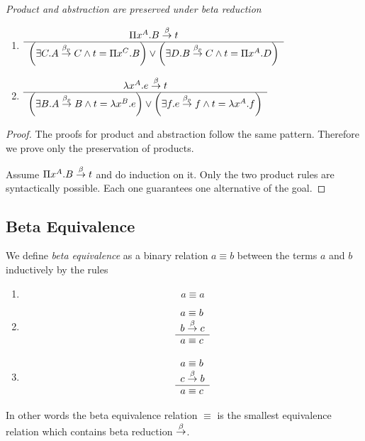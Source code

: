 \begin{lemma}
    \label{ReductionProductAbstraction}
    \emph{Product and abstraction are preserved under beta reduction}
    \begin{enumerate}
    \item
    $
        \begin{array}{c} 
            \Pi x^A.B \stackrel{\beta}{\to} t
         \\ \hline 
            \left( \exists C. A \stackrel{\beta_p}{\to} C \land t = \Pi x^C. B \right)
            \lor
            \left( \exists D. B \stackrel{\beta_p}{\to} C \land t = \Pi x^A. D \right)
        \end{array}
    $
    \item
    $
        \begin{array}{c} 
            \lambda x^A.e \stackrel{\beta}{\to} t
         \\ \hline 
            \left( \exists B. A \stackrel{\beta_p}{\to} B \land t = \lambda x^B. e \right)
            \lor
            \left( \exists f. e \stackrel{\beta_p}{\to} f \land t = \lambda x^A. f \right)
        \end{array}
    $
    \end{enumerate}

    \begin{proof}
        The proofs for product and abstraction follow the same pattern.
        Therefore we prove only the preservation of products.

        Assume $\Pi x^A. B \stackrel{\beta}{\to} t$ and do induction on it. Only the two
        product rules are syntactically possible. Each one guarantees one
        alternative of the goal.
    \end{proof}
\end{lemma}



\subsection{Beta Equivalence}


\begin{definition}
    We define \emph{beta equivalence} as a binary relation $a \equiv b$ between
    the terms $a$ and $b$ inductively by the rules
    \begin{enumerate}
    \item
        $$ a \equiv a$$

    \item
        $$
        \begin{array}{l} 
            a \equiv b
            \\
            b \stackrel{\beta}{\to} c
         \\ \hline 
            a \equiv c
        \end{array}
        $$

    \item
        $$
        \begin{array}{l} 
            a \equiv b
            \\
            c \stackrel{\beta}{\to} b
         \\ \hline 
            a \equiv c
        \end{array}
        $$
    \end{enumerate}

    In other words the beta equivalence relation $\equiv$ is the smallest
    equivalence relation which contains beta reduction $\stackrel{\beta}{\to}$.
\end{definition}
